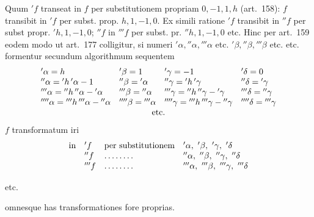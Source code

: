 Quum ${}'f$ transeat in $f$ per substitutionem propriam $0,-1,1,h$ (art.~158): $f$ transibit in ${}'f$ per subst. prop. $h,1,-1,0$. Ex simili ratione ${}'f$ transibit in ${}''f$ per subst propr. ${}'h,1,-1,0$; ${}''f$ in ${}'''f$ per subst. pr. ${}''h,1,-1,0$ etc. Hinc per art.~159 eodem modo ut art.~177 colligitur, si numeri ${}'\alpha,{}''\alpha,{}'''\alpha$ etc. ${}'\beta,{}''\beta,{}'''\beta$ etc. etc. formentur secundum algorithmum sequentem
{\small
\setlength{\arraycolsep}{3pt}
\[
\begin{array}{llll}
{}'\alpha=h&{}'\beta=1&{}'\gamma=-1&{}'\delta=0\\
{}''\alpha={}'h\,{}'\alpha-1&{}''\beta={}'\alpha&{}''\gamma={}'h\,{}'\gamma&{}''\delta={}'\gamma\\
{}'''\alpha={}''h\,{}''\alpha-{}'\alpha&{}'''\beta={}''\alpha&{}'''\gamma={}''h\,{}''\gamma-{}'\gamma&{}'''\delta={}''\gamma\\
{}''''\alpha={}'''h\,{}'''\alpha-{}''\alpha&{}''''\beta={}'''\alpha&{}''''\gamma={}'''h\,{}'''\gamma-{}''\gamma&{}''''\delta={}'''\gamma
\\
\multicolumn{4}{c}{\text{etc.}}
\end{array}
\]
}
$f$ transformatum iri
\[
\begin{array}{@{}rlll@{}}
\text{in}&{}'f&\text{per substitutionem}&{}'\alpha,\ {}'\beta,\ {}'\gamma,\ {}'\delta\\
&{}''f&\mathinner{\ldotp\ldotp\ldotp\ldotp\ldotp\ldotp\ldotp\ldotp}&{}''\alpha,\ {}''\beta,\ {}''\gamma,\ {}''\delta\\
&{}'''f&\mathinner{\ldotp\ldotp\ldotp\ldotp\ldotp\ldotp\ldotp\ldotp}&{}'''\alpha,\ {}'''\beta,\ {}'''\gamma,\ {}'''\delta
\end{array}
\]
\centerline{etc.}
omnesque has transformationes fore proprias.

